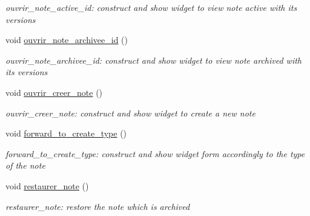 \begin{DoxyCompactItemize}
\begin{DoxyCompactList}\small\item\em ouvrir\+\_\+note\+\_\+active\+\_\+id\+: construct and show widget to view note active with its versions \end{DoxyCompactList}\item 
\mbox{\label{class_interface_a741673a4341956dba8eb4d6173931fca}} 
void \hyperlink{class_interface_a741673a4341956dba8eb4d6173931fca}{ouvrir\+\_\+note\+\_\+archivee\+\_\+id} ()
\begin{DoxyCompactList}\small\item\em ouvrir\+\_\+note\+\_\+archivee\+\_\+id\+: construct and show widget to view note archived with its versions \end{DoxyCompactList}\item 
\mbox{\label{class_interface_a98b07127215c9316870987d49b2e0d3c}} 
void \hyperlink{class_interface_a98b07127215c9316870987d49b2e0d3c}{ouvrir\+\_\+creer\+\_\+note} ()
\begin{DoxyCompactList}\small\item\em ouvrir\+\_\+creer\+\_\+note\+: construct and show widget to create a new note \end{DoxyCompactList}\item 
\mbox{\label{class_interface_a2ebf4a5fd59fa36584671931daae622a}} 
void \hyperlink{class_interface_a2ebf4a5fd59fa36584671931daae622a}{forward\+\_\+to\+\_\+create\+\_\+type} ()
\begin{DoxyCompactList}\small\item\em forward\+\_\+to\+\_\+create\+\_\+type\+: construct and show widget form accordingly to the type of the note \end{DoxyCompactList}\item 
\mbox{\label{class_interface_a326cdc1e75cc89190832376aaa56d3af}} 
void \hyperlink{class_interface_a326cdc1e75cc89190832376aaa56d3af}{restaurer\+\_\+note} ()
\begin{DoxyCompactList}\small\item\em restaurer\+\_\+note\+: restore the note which is archived \end{DoxyCompactList}\item 
\mbox{\label{class_interface_ab4cdf89b7b6c8120c44625356a4987c1}} 

\end{DoxyCompactItemize}

